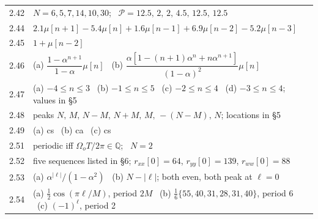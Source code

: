 \begin{center}
\begin{tabular}{@{}ll@{}}
2.42 & $N=6,5,7,14,10,30$; \ $\mathcal{P}=12.5,\,2,\,2,\,4.5,\,12.5,\,12.5$\\
2.44 & $2.1\mu[n{+}1]-5.4\mu[n]+1.6\mu[n{-}1]+6.9\mu[n{-}2]-5.2\mu[n{-}3]$\\
2.45 & $1+\mu[n-2]$\\
2.46 & (a) $\dfrac{1-\alpha^{n+1}}{1-\alpha}\mu[n]$ \ (b) $\dfrac{\alpha[1-(n{+}1)\alpha^n+n\alpha^{n+1}]}{(1-\alpha)^2}\mu[n]$\\
2.47 & (a) $-4\le n\le3$ \ (b) $-1\le n\le5$ \ (c) $-2\le n\le4$ \ (d) $-3\le n\le4$; values in \S5\\
2.48 & peaks $N,\,M,\,N{-}M,\,N{+}M,\,M,\,-(N{-}M),\,N$; locations in \S5\\
2.49 & (a) cs \ (b) ca \ (c) cs\\
2.51 & periodic iff $\Omega_oT/2\pi\in\mathbb{Q}$; \ $N=2$\\
2.52 & five sequences listed in \S6; $r_{xx}[0]=64$, $r_{yy}[0]=139$, $r_{ww}[0]=88$\\
2.53 & (a) $\alpha^{|\ell|}/(1-\alpha^2)$ \ (b) $N-|\ell|$; both even, both peak at $\ell=0$\\
2.54 & (a) $\tfrac12\cos(\pi\ell/M)$, period $2M$ \ (b) $\tfrac16\{55,40,31,28,31,40\}$, period 6
       \ (c) $(-1)^\ell$, period 2\\
\bottomrule
\end{tabular}
\end{center}
